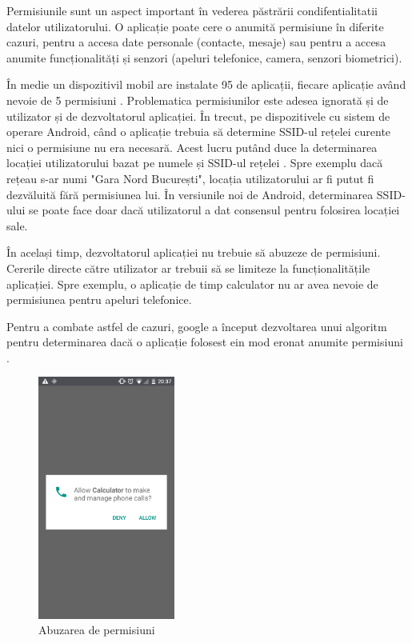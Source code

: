 \documentclass[12pt]{article}
\begin{document}
Permisiunile sunt un aspect important în vederea păstrării condifentialitatii datelor utilizatorului.
O aplicație poate cere o anumită permisiune în diferite cazuri, pentru a accesa date personale (contacte, mesaje)
sau pentru a accesa anumite funcționalități și senzori (apeluri telefonice, camera, senzori biometrici).

În medie un dispozitivil mobil are instalate 95 de aplicații, fiecare aplicație având nevoie
de 5 permisiuni \cite{liu2016follow}. Problematica permisiunilor este adesea ignorată și de utilizator
și de dezvoltatorul aplicației. 
În trecut, pe dispozitivele cu sistem de operare Android, când o aplicație trebuia
să determine SSID-ul rețelei curente nici o permisiune nu era necesară. Acest lucru putând duce la
determinarea locației utilizatorului bazat pe numele și SSID-ul rețelei \cite{ssidloc}. Spre exemplu dacă rețeau s-ar numi
"Gara Nord București", locația utilizatorului ar fi putut fi dezvăluită fără permisiunea lui. În versiunile noi de Android,
determinarea SSID-ului se poate face doar dacă utilizatorul a dat consensul pentru
folosirea locației sale.

În același timp, dezvoltatorul aplicației nu trebuie să abuzeze de permisiuni. Cererile directe 
către utilizator ar trebuii să se limiteze la funcționalitățile aplicației. Spre exemplu, o aplicație
de timp calculator nu ar avea nevoie de permisiunea pentru apeluri telefonice.

Pentru a combate astfel de cazuri, google a început dezvoltarea unui algoritm pentru 
determinarea dacă o aplicație folosest ein mod eronat anumite permisiuni \cite{googleperm}.

\begin{figure}[H]
    \centering
    \includegraphics[height=8cm]{calc.png}
    \caption{Abuzarea de permisiuni \cite{redditcalc}}
    \end{figure}
\end{document}
